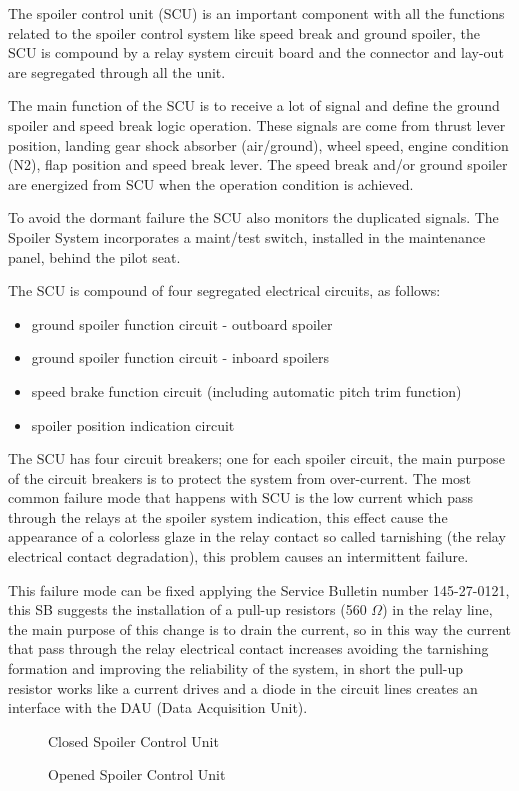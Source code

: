 The spoiler control unit (SCU) is an important component with all the functions related to the spoiler control system like speed break and ground spoiler, the SCU is compound by a relay system circuit board and the connector and lay-out are segregated through all the unit.

The main function of the SCU is to receive a lot of signal and define the ground spoiler and speed break logic operation. These signals are come from thrust lever position, landing gear shock absorber (air/ground), wheel speed, engine condition (N2), flap position and speed break lever. The speed break and/or ground spoiler are energized from SCU when the operation condition is achieved.

To avoid the dormant failure the SCU also monitors the duplicated signals. The Spoiler System incorporates a maint/test switch, installed in the maintenance panel, behind the pilot seat.

The SCU is compound of four segregated electrical circuits, as follows:
\begin{itemize}
    \item ground spoiler function circuit - outboard spoiler
    \item ground spoiler function circuit - inboard spoilers
    \item speed brake function circuit (including automatic pitch trim function)
    \item spoiler position indication circuit
\end{itemize}

The SCU has four circuit breakers; one for each spoiler circuit, the main purpose of the circuit breakers is to protect the system from over-current.
The most common failure mode that happens with SCU is the low current which pass through the relays at the spoiler system indication, this effect cause the appearance of a colorless glaze in the relay contact so called tarnishing (the relay electrical contact degradation), this problem causes an intermittent failure.

This failure mode can be fixed applying the Service Bulletin number 145-27-0121, this SB suggests the installation of a pull-up resistors (560 $\Omega$) in the relay line, the main purpose of this change is to drain the current, so in this way the current that pass through the relay electrical contact increases avoiding the tarnishing formation and improving the reliability of the system, in short the pull-up resistor works like a current drives and a diode in the circuit lines creates an interface with the DAU (Data Acquisition Unit).

\begin{figure}[H] %
\caption{Closed Spoiler Control Unit}
\label{fig:ClosedSCU}
\end{figure}

\begin{figure}[H] %
\caption{Opened Spoiler Control Unit}
\label{fig:OpenSCU}
\end{figure}
